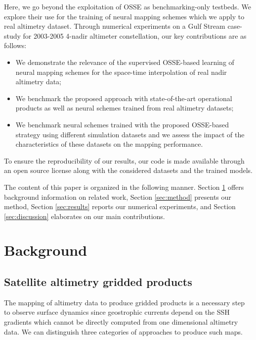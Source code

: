 \documentclass[draft]{agujournal2019}
\begin{document}
Here, we go beyond the exploitation of OSSE as benchmarking-only testbeds. We explore their use for the training of neural mapping schemes which we apply to real altimetry dataset. Through numerical experiments on a Gulf Stream case-study for 2003-2005 4-nadir altimeter constellation, our key contributions are as follows:  

    \begin{itemize}
    \item{We demonstrate the relevance of the supervised OSSE-based learning of neural mapping schemes for the space-time interpolation of real nadir altimetry data;}
    \item{We benchmark the proposed approach with state-of-the-art operational products as well as neural schemes trained from real altimetry datasets;}    
    \item{We benchmark neural schemes trained with the proposed OSSE-based strategy using different simulation datasets and we assess the impact of the characteristics of these datasets on the mapping performance.}
    \end{itemize}
To ensure the reproducibility of our results, our code is made available through an open source license along with the considered datasets and the trained models.

    
The content of this paper is organized in the following manner. Section \ref{sec:background} offers background information on related work, Section \ref{sec:method} presents our method, Section \ref{sec:results} reports our numerical experiments, and Section \ref{sec:discussion} elaborates on our main contributions.



\section{Background}
\label{sec:background}
\subsection{Satellite altimetry gridded products}
\label{ssec:interpolation}
The mapping of altimetry data to produce gridded products is a necessary step to observe surface dynamics since geostrophic currents depend on the SSH gradients which cannot be directly computed from one dimensional altimetry data. We can distinguish three categories of approaches to produce such maps. 
\end{document}
